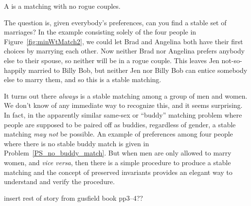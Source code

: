 \begin{definition}
  A  is a matching with no rogue couples.
\end{definition}

The question is, given everybody's preferences, can you find a stable
set of marriages?  In the example consisting solely of the four people
in Figure~\ref{fig:minWtMatch2}, we could let Brad and Angelina both
have their first choices by marrying each other.  Now neither Brad nor
Angelina prefers anybody else to their spouse, so neither will be in a
rogue couple.  This leaves Jen not-so-happily married to Billy Bob,
but neither Jen nor Billy Bob can entice somebody else to marry them,
and so this is a stable matching.

It turns out there \emph{always} is a stable matching among a group of
men and women.  We don't know of any immediate way to recognize this,
and it seems surprising.  In fact, in the apparently similar same-sex
or ``buddy'' matching problem where people are supposed to be paired
off as buddies, regardless of gender, a stable matching \emph{may not}
be possible.  An example of preferences among four people where there
is no stable buddy match is given in Problem~\ref{PS_no_buddy_match}.
But when men are only allowed to marry women, and \emph{vice versa},
then there is a simple procedure to produce a stable matching and the
concept of preserved invariants provides an elegant way to understand
and verify the procedure.

\begin{editingnotes}
insert rest of story from gusfield book pp3--4??
\end{editingnotes}

